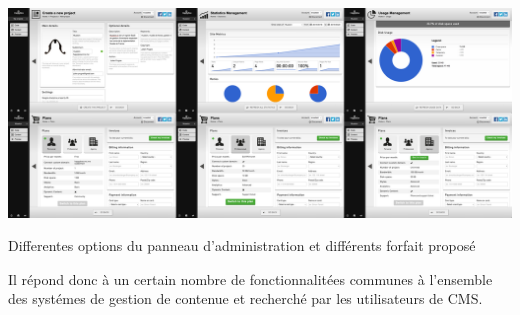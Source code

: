 \documentclass[11pt, a4paper ]{report}
\begin{document}
\begin{center}
	\includegraphics[width=\textwidth]{images/HBscreen/dash.png}
	\caption{Differentes options du panneau d'administration et différents forfait proposé}
\end{center}



Il répond donc à un certain nombre de fonctionnalitées communes à l'ensemble des systémes de gestion de contenue et recherché par les utilisateurs de CMS\cite{enqueteCMSSmile}.
\end{document}
